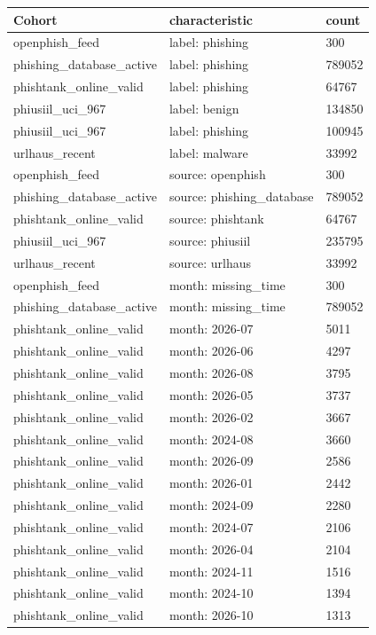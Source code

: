 \begin{tabular}{lll}
Cohort & characteristic & count \\
\hline
openphish\_feed & label: phishing & 300 \\
phishing\_database\_active & label: phishing & 789052 \\
phishtank\_online\_valid & label: phishing & 64767 \\
phiusiil\_uci\_967 & label: benign & 134850 \\
phiusiil\_uci\_967 & label: phishing & 100945 \\
urlhaus\_recent & label: malware & 33992 \\
openphish\_feed & source: openphish & 300 \\
phishing\_database\_active & source: phishing\_database & 789052 \\
phishtank\_online\_valid & source: phishtank & 64767 \\
phiusiil\_uci\_967 & source: phiusiil & 235795 \\
urlhaus\_recent & source: urlhaus & 33992 \\
openphish\_feed & month: missing\_time & 300 \\
phishing\_database\_active & month: missing\_time & 789052 \\
phishtank\_online\_valid & month: 2026-07 & 5011 \\
phishtank\_online\_valid & month: 2026-06 & 4297 \\
phishtank\_online\_valid & month: 2026-08 & 3795 \\
phishtank\_online\_valid & month: 2026-05 & 3737 \\
phishtank\_online\_valid & month: 2026-02 & 3667 \\
phishtank\_online\_valid & month: 2024-08 & 3660 \\
phishtank\_online\_valid & month: 2026-09 & 2586 \\
phishtank\_online\_valid & month: 2026-01 & 2442 \\
phishtank\_online\_valid & month: 2024-09 & 2280 \\
phishtank\_online\_valid & month: 2024-07 & 2106 \\
phishtank\_online\_valid & month: 2026-04 & 2104 \\
phishtank\_online\_valid & month: 2024-11 & 1516 \\
phishtank\_online\_valid & month: 2024-10 & 1394 \\
phishtank\_online\_valid & month: 2026-10 & 1313 \\

\end{tabular}
